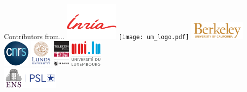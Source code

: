 \documentclass[unknownkeysallowed]{beamer}
\begin{document}
\begin{frame}{Contributors from...}
    \centering
    \includegraphics[width=100px]{logo_inria_horiz.pdf} \hspace{1mm}
    \texttt{[image: um\_logo.pdf]} \hspace{1mm}
    \includegraphics[height=35px]{logo_berkeley.png} \hspace{1mm}
    \\[7mm]
    \includegraphics[height=50px]{logo_cnrs.pdf} \hspace{5mm}
    \includegraphics[height=50px]{logo_lund} \hspace{5mm}
    \includegraphics[height=50px]{logo_telecom.pdf} \hspace{5mm}
    \includegraphics[height=50px]{logo_univ_luxembourg.pdf} \\[4mm]
    \includegraphics[height=40px]{logo_ens.png}
\end{frame}
\end{document}
